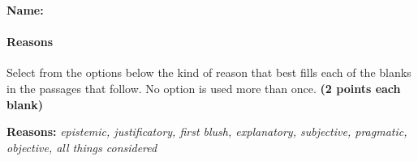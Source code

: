 \documentclass[10pt]{article}
\begin{document}
\small

\textbf{Name:}\underline{\hspace{2in}}

\paragraph{Reasons}

Select from the options below the kind of reason that best fills each of the blanks in the passages that follow. No option is used more than once. \textbf{(2 points each blank)}

\begin{center}\textbf{Reasons:} \textit{epistemic, justificatory, first blush, explanatory, subjective, pragmatic, objective, all things considered}\end{center}
\end{document}
